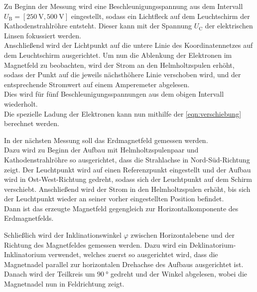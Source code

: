     \clearpage
    Zu Beginn der Messung wird eine Beschleunigungsspannung aus dem Intervall
    $U_\text{B} = [\SI{250}{\volt}, \SI{500}{\volt}]$ eingestellt,
    sodass ein Lichtfleck auf dem Leuchtschirm der Kathodenstrahlröhre entsteht.
    Dieser kann mit der Spannung $U_\text{C}$ der elektrischen Linsen fokussiert werden.\\
    Anschließend wird der Lichtpunkt auf die untere Linie des Koordinatennetzes auf dem Leuchtschirm ausgerichtet.
    Um nun die Ablenkung der Elektronen im Magnetfeld zu beobachten,
    wird der Strom an den Helmholtzspulen erhöht,
    sodass der Punkt auf die jeweils nächsthöhere Linie verschoben wird,
    und der entsprechende Stromwert auf einem Amperemeter abgelesen.\\
    Dies wird für fünf Beschleunigungsspannungen aus dem obigen Intervall wiederholt.\\
    Die spezielle Ladung der Elektronen kann nun mithilfe der \autoref{eqn:verschiebung} berechnet werden.

    \label{sec:durchfuehrung:502:erdmagnetfeld}
    In der nächsten Messung soll das Erdmagnetfeld gemessen werden.\\
    Dazu wird zu Beginn der Aufbau mit Helmholtzspulenpaar und Kathodenstrahlröhre so ausgerichtet,
    dass die Strahlachse in Nord-Süd-Richtung zeigt.
    Der Leuchtpunkt wird auf einen Referenzpunkt eingestellt
    und der Aufbau wird in Ost-West-Richtung gedreht,
    sodass sich der Leuchtpunkt auf dem Schirm verschiebt.
    Anschließend wird der Strom in den Helmholtzspulen erhöht,
    bis sich der Leuchtpunkt wieder an seiner vorher eingestellten Position befindet.\\
    Dann ist das erzeugte Magnetfeld gegengleich zur Horizontalkomponente des Erdmagnetfelds.

    Schließlich wird der Inklinationswinkel $\varphi$
    zwischen Horizontalebene und der Richtung des Magnetfeldes gemessen werden.
    Dazu wird ein Deklinatorium-Inklinatorium verwendet,
    welches zuerst so ausgerichtet wird,
    dass die Magnetnadel parallel zur horizontalen Drehachse des Aufbaus ausgerichtet ist.
    Danach wird der Teilkreis um $\SI{90}{\degree}$ gedreht und der Winkel abgelesen,
    wobei die Magnetnadel nun in Feldrichtung zeigt.
